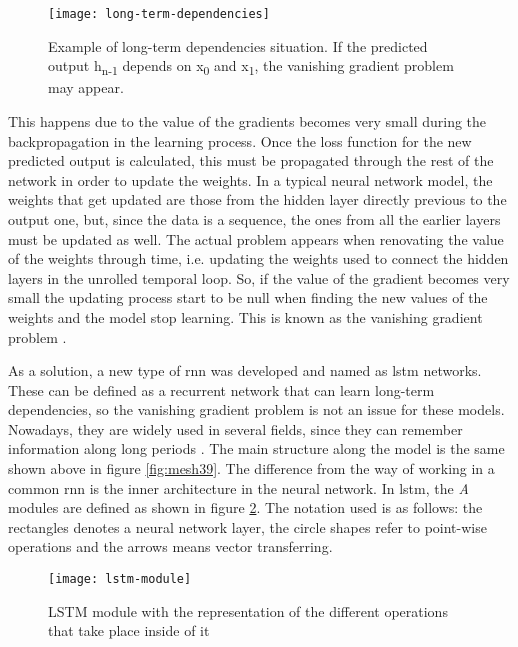 	\begin{figure}[h]
		\centering
		\captionsetup{justification=centering}
		\texttt{[image: long-term-dependencies]}
		\caption{Example of long-term dependencies situation. If the predicted output h\textsubscript{n-1} depends on x\textsubscript{0} and x\textsubscript{1}, the vanishing gradient problem may appear.}
		\label{fig:mesh40}
	\end{figure}
	
	This happens due to the value of the gradients becomes very small during the backpropagation in the learning process. Once the loss function for the new predicted output is calculated, this must be propagated through the rest of the network in order to update the weights. In a typical neural network model, the weights that get updated are those from the hidden layer directly previous to the output one, but, since the data is a sequence, the ones from all the earlier layers must be updated as well. The actual problem appears when renovating the value of the weights through time, i.e. updating the weights used to connect the hidden layers in the unrolled temporal loop. So, if the value of the gradient becomes very small the updating process start to be null when finding the new values of the weights and the model stop learning. This is known as the vanishing gradient problem \cite{SuperDataScienceTeam2018}.
	
	As a solution, a new type of \acrshort{rnn} was developed and named as \acrfull{lstm} networks. These can be defined as a recurrent network that can learn long-term dependencies, so the vanishing gradient problem is not an issue for these models. Nowadays, they are widely used in several fields, since they can remember information along long periods \cite{Olah2015}. The main structure along the model is the same shown above in figure \ref{fig:mesh39}. The difference from the way of working in a common \acrshort{rnn} is the inner architecture in the neural network. In \acrshort{lstm}, the \textit{A} modules are defined as shown in figure \ref{fig:mesh41}. The notation used is as follows: the rectangles denotes a neural network layer, the circle shapes refer to point-wise operations and the arrows means vector transferring.
	
	\begin{figure}
		\centering
		\captionsetup{justification=centering}
		\texttt{[image: lstm-module]}
		\caption{LSTM module with the representation of the different operations that take place inside of it}
		\label{fig:mesh41}
	\end{figure}

